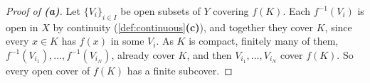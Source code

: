 \begin{proof}[Proof of \textbf{(a)}]
Let $\{V_i\}_{i \in I}$ be open subsets of $Y$ covering $f(K)$. Each $f^{-1}(V_i)$ is open in $X$
by continuity (\cref{def:continuous}\textbf{(c)}), and together they cover $K$, since every
$x \in K$ has $f(x)$ in some $V_i$. As $K$ is compact, finitely many of them,
$f^{-1}(V_{i_1}),\dots,f^{-1}(V_{i_N})$, already cover $K$, and then
$V_{i_1},\dots,V_{i_N}$ cover $f(K)$. So every open cover of $f(K)$ has a finite subcover.
\end{proof}

\begin{center}
%
\end{center}
